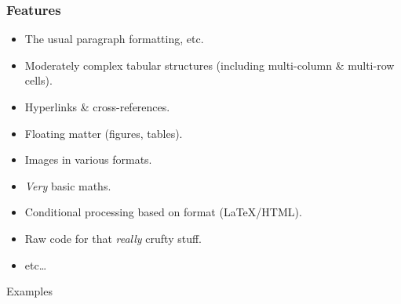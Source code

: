 \frame
{
	\frametitle{Features}
	
	\begin{itemize}
	
		\item The usual paragraph formatting, etc.
		
		\item Moderately complex tabular structures (including
		multi-column \& multi-row cells).
		
		\item Hyperlinks \& cross-references.
		
		\item Floating matter (figures, tables).
		
		
		\item Images in various formats.
		
		\item \emph{Very} basic maths.
		
		\item Conditional processing based on format (\LaTeX/HTML).
	
		\item Raw code for that \emph{really} crufty stuff.
		
		\item etc\ldots
		
	\end{itemize}
}


\frame
{
	\centering\Huge\alert{Examples}
	
	
	
	
}


